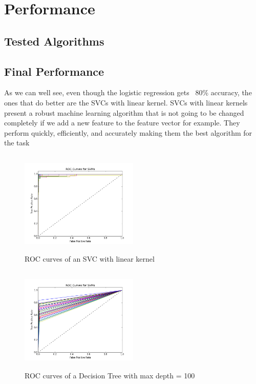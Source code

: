 \documentclass{article}
\begin{document}
\section{Performance}
\subsection{Tested Algorithms}

\subsection{Final Performance}

 As we can well see, even though the logistic regression gets ~80\% accuracy, the ones that do better are the SVCs with linear kernel. SVCs with linear kernels present a robust machine learning algorithm that is not going to be changed completely if we add a new feature to the feature vector for example. They perform quickly, efficiently, and accurately making them the best algorithm for the task


\begin{figure}[H]
	\centering
	\includegraphics[width=0.5\textwidth, height= 5cm]{roc_svm_francisco__svm.png}
	\caption{ROC curves of an SVC with linear kernel}
\end{figure} 
\begin{figure}[H]
	\centering
	\includegraphics[width=0.5\textwidth, height= 5cm]{roc_tree1_dt.png}
	\caption{ROC curves of a Decision Tree with max depth = 100}
\end{figure} 
\end{document}

